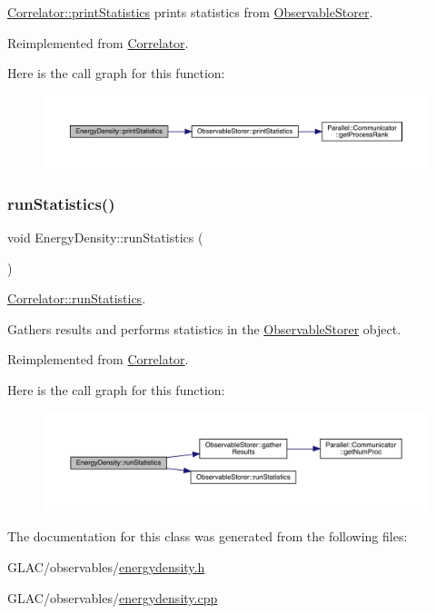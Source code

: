 \mbox{\hyperlink{class_correlator_a2168d677f547769784781d2e2aaa53cf}{Correlator\+::print\+Statistics}} prints statistics from \mbox{\hyperlink{class_observable_storer}{Observable\+Storer}}. 



Reimplemented from \mbox{\hyperlink{class_correlator_a2168d677f547769784781d2e2aaa53cf}{Correlator}}.

Here is the call graph for this function\+:
\nopagebreak
\begin{figure}[H]
\begin{center}
\leavevmode
\includegraphics[width=350pt]{class_energy_density_ad108e32bc670f17f15b4ed433d8bbec7_cgraph}
\end{center}
\end{figure}
\mbox{\label{class_energy_density_a584e164453ce880a45478c9b48ce2c4b}} 
\subsubsection{\texorpdfstring{runStatistics()}{runStatistics()}}
{\footnotesize\ttfamily void Energy\+Density\+::run\+Statistics (\begin{DoxyParamCaption}{ }\end{DoxyParamCaption})\hspace{0.3cm}{\ttfamily [virtual]}}



\mbox{\hyperlink{class_correlator_a35197b1d12b62ef30b79c0138a26456e}{Correlator\+::run\+Statistics}}. 

Gathers results and performs statistics in the \mbox{\hyperlink{class_observable_storer}{Observable\+Storer}} object. 

Reimplemented from \mbox{\hyperlink{class_correlator_a35197b1d12b62ef30b79c0138a26456e}{Correlator}}.

Here is the call graph for this function\+:
\nopagebreak
\begin{figure}[H]
\begin{center}
\leavevmode
\includegraphics[width=350pt]{class_energy_density_a584e164453ce880a45478c9b48ce2c4b_cgraph}
\end{center}
\end{figure}


The documentation for this class was generated from the following files\+:\begin{DoxyCompactItemize}
\item 
G\+L\+A\+C/observables/\mbox{\hyperlink{energydensity_8h}{energydensity.\+h}}\item 
G\+L\+A\+C/observables/\mbox{\hyperlink{energydensity_8cpp}{energydensity.\+cpp}}\end{DoxyCompactItemize}
